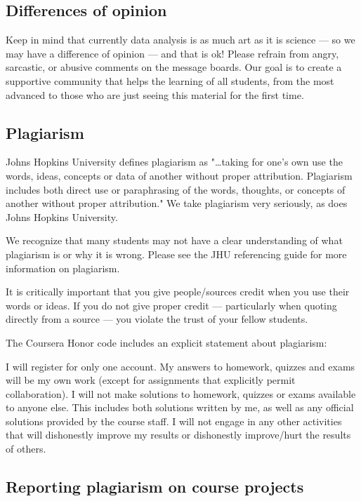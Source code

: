 \subsection*{Differences of opinion}

Keep in mind that currently data analysis is as much art as it is science --- so we may have a difference of opinion --- and that is ok! Please refrain from angry, sarcastic, or abusive comments on the message boards. Our goal is to create a supportive community that helps the learning of all students, from the most advanced to those who are just seeing this material for the first time.


\subsection*{Plagiarism}

Johns Hopkins University defines plagiarism as "\ldots taking for one's own use the words, ideas, concepts or data of another without proper attribution. Plagiarism includes both direct use or paraphrasing of the words, thoughts, or concepts of another without proper attribution." We take plagiarism very seriously, as does Johns Hopkins University.

We recognize that many students may not have a clear understanding of what plagiarism is or why it is wrong. Please see the JHU referencing guide for more information on plagiarism.

It is critically important that you give people/sources credit when you use their words or ideas. If you do not give proper credit --- particularly when quoting directly from a source --- you violate the trust of your fellow students.

The Coursera Honor code includes an explicit statement about plagiarism:

I will register for only one account. My answers to homework, quizzes and exams will be my own work (except for assignments that explicitly permit collaboration). I will not make solutions to homework, quizzes or exams available to anyone else. This includes both solutions written by me, as well as any official solutions provided by the course staff. I will not engage in any other activities that will dishonestly improve my results or dishonestly improve/hurt the results of others.


\subsection*{Reporting plagiarism on course projects}

